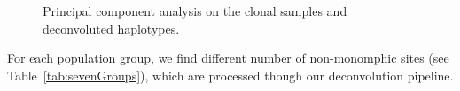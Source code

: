 \documentclass{article}
\begin{document}
\begin{figure}[h]
\centering
{}
\caption{Principal component analysis on the clonal samples and deconvoluted haplotypes.}\label{fig:pca}
\end{figure}


For each population group, we find different number of non-monomphic sites (see Table~\ref{tab:sevenGroups}), which are processed though our deconvolution pipeline.
\end{document}

